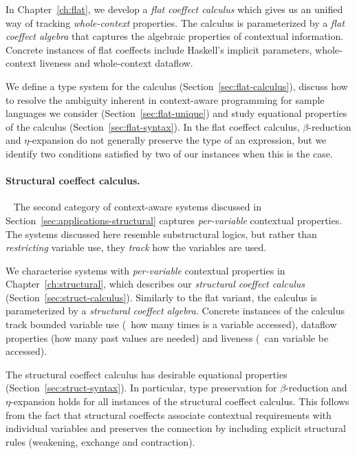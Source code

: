 In Chapter~\ref{ch:flat}, we develop a \emph{flat coeffect calculus} which gives us an unified way
of tracking \emph{whole-context} properties. The calculus is parameterized by a \emph{flat coeffect
algebra} that captures the algebraic properties of contextual information. Concrete
instances of flat coeffects include Haskell's implicit parameters, whole-context liveness and
whole-context dataflow.

We define a type system for the calculus (Section~\ref{sec:flat-calculus}),
discuss how to resolve the ambiguity inherent in context-aware programming for sample
languages we consider (Section~\ref{sec:flat-unique}) and study equational properties of the
calculus (Section~\ref{sec:flat-syntax}). In the flat coeffect calculus, $\beta$-reduction and
$\eta$-expansion do not generally preserve the type of an expression, but we identify two
conditions satisfied by two of our instances when this is the case.


\paragraph{Structural coeffect calculus.}

~ The second category of context-aware systems discussed in Section~\ref{sec:applications-structural}
captures \emph{per-variable} contextual properties. The systems discussed here resemble substructural
logics, but rather than \emph{restricting} variable use, they \emph{track} how the variables are used.

We characterise systems with \emph{per-variable} contextual properties in Chapter~\ref{ch:structural},
which describes our \emph{structural coeffect calculus} (Section~\ref{sec:struct-calculus}).
Similarly to the flat variant, the calculus is parameterized by a \emph{structural coeffect algebra}.
Concrete instances of the calculus track bounded variable use (\ie~how many times is a variable
accessed), dataflow properties (how many past values are needed) and liveness (\ie~can variable
be accessed).

The structural coeffect calculus has desirable equational properties (Section~\ref{sec:struct-syntax}).
In particular, type preservation for $\beta$-reduction and $\eta$-expansion holds for all instances of the
structural coeffect calculus. This follows from the fact that structural coeffects
associate contextual requirements with individual variables and preserves the connection by
including explicit structural rules (weakening, exchange and contraction).

